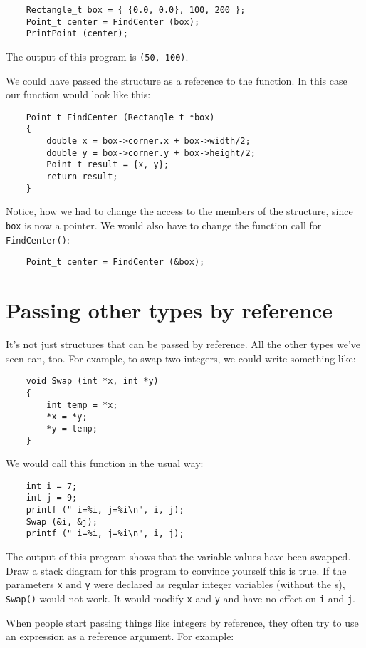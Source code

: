 \begin{verbatim}
	Rectangle_t box = { {0.0, 0.0}, 100, 200 };
	Point_t center = FindCenter (box);
	PrintPoint (center);
\end{verbatim}
%
The output of this program is {\tt (50, 100)}.

We could have passed the structure as a reference to the
function. In this case our function would look like this:

\begin{verbatim}
	Point_t FindCenter (Rectangle_t *box)
	{
		double x = box->corner.x + box->width/2;
		double y = box->corner.y + box->height/2;
		Point_t result = {x, y};
		return result;
	}
\end{verbatim}
Notice, how we had to change the access to the members of the 
structure, since {\tt box} is now a pointer. 
We would also have to change the function call for {\tt FindCenter()}:

\begin{verbatim}
	Point_t center = FindCenter (&box);
\end{verbatim}

\section {Passing other types by reference}

It's not just structures that can be passed by reference.
All the other types we've seen can, too.  For example, to swap
two integers, we could write something like:

\begin{verbatim}
	void Swap (int *x, int *y)
	{
		int temp = *x;
		*x = *y;
		*y = temp;
	}
\end{verbatim}
%
We would call this function in the usual way:

\begin{verbatim}
	int i = 7;
	int j = 9;
	printf (" i=%i, j=%i\n", i, j);
	Swap (&i, &j);
	printf (" i=%i, j=%i\n", i, j);
\end{verbatim}
%
The output of this program shows that the variable
values have been swapped.  Draw a stack
diagram for this program to convince yourself this is true.
If the parameters {\tt x} and {\tt y} were declared as
regular integer variables (without the {\tt \*}s), {\tt Swap()} would
not work.  It would modify {\tt x} and {\tt y} and have no
effect on {\tt i} and {\tt j}.

When people start passing things like integers by reference,
they often try to use an expression
as a reference argument.  For example:

